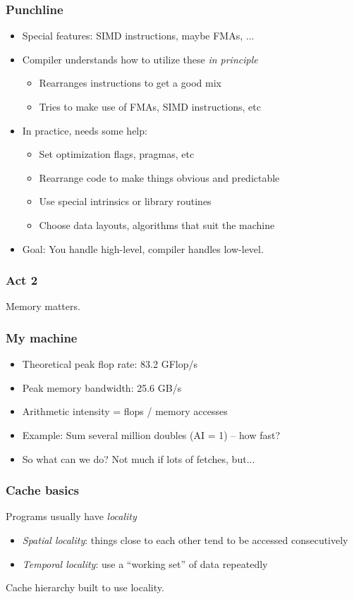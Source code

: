 \documentclass{beamer}
\begin{document}
\begin{frame}
  \frametitle{Punchline}
  
  \begin{itemize}
  \item Special features: SIMD instructions, maybe FMAs, ...
  \item Compiler understands how to utilize these {\em in principle}
    \begin{itemize}
    \item Rearranges instructions to get a good mix
    \item Tries to make use of FMAs, SIMD instructions, etc
    \end{itemize}
  \item In practice, needs some help:
    \begin{itemize}
    \item Set optimization flags, pragmas, etc
    \item Rearrange code to make things obvious and predictable
    \item Use special intrinsics or library routines
    \item Choose data layouts, algorithms that suit the machine
    \end{itemize}
  \item Goal: You handle high-level, compiler handles low-level.
  \end{itemize}
    
\end{frame}

\begin{frame}
  \frametitle{Act 2}
  Memory matters.
\end{frame}


\begin{frame}
  \frametitle{My machine}

  \begin{itemize}
  \item Theoretical peak flop rate: 83.2 GFlop/s
  \item Peak memory bandwidth: 25.6 GB/s
  \item Arithmetic intensity = flops / memory accesses
  \item Example: Sum several million doubles (AI = 1) -- how fast?
  \item So what can we do?  Not much if lots of fetches, but...
  \end{itemize}
\end{frame}


\begin{frame}
  \frametitle{Cache basics}
  
  Programs usually have {\em locality}
  \begin{itemize}
  \item {\em Spatial locality}: things close to each other tend to be
    accessed consecutively
  \item {\em Temporal locality}: use a ``working set'' of data repeatedly
  \end{itemize}
  Cache hierarchy built to use locality.

\end{frame}
\end{document}
